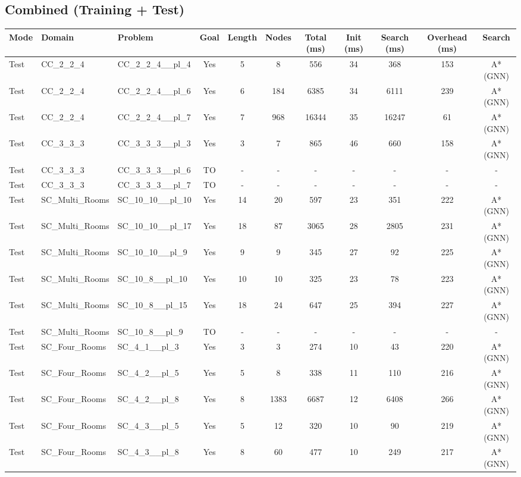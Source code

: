 \documentclass{article}
\begin{document}
\subsection*{Combined (Training + Test)}
\begin{tabular}{lllcccccccc}
\toprule
Mode & Domain & Problem & Goal & Length & Nodes & Total (ms) & Init (ms) & Search (ms) & Overhead (ms) & Search \\
\midrule
Test & CC\_2\_2\_4 & CC\_2\_2\_4\_\_pl\_4 & Yes & 5 & 8 & 556 & 34 & 368 & 153 & A*(GNN) \\
Test & CC\_2\_2\_4 & CC\_2\_2\_4\_\_pl\_6 & Yes & 6 & 184 & 6385 & 34 & 6111 & 239 & A*(GNN) \\
Test & CC\_2\_2\_4 & CC\_2\_2\_4\_\_pl\_7 & Yes & 7 & 968 & 16344 & 35 & 16247 & 61 & A*(GNN) \\
Test & CC\_3\_3\_3 & CC\_3\_3\_3\_\_pl\_3 & Yes & 3 & 7 & 865 & 46 & 660 & 158 & A*(GNN) \\
Test & CC\_3\_3\_3 & CC\_3\_3\_3\_\_pl\_6 & TO & - & - & - & - & - & - & - \\
Test & CC\_3\_3\_3 & CC\_3\_3\_3\_\_pl\_7 & TO & - & - & - & - & - & - & - \\
Test & SC\_Multi\_Rooms & SC\_10\_10\_\_pl\_10 & Yes & 14 & 20 & 597 & 23 & 351 & 222 & A*(GNN) \\
Test & SC\_Multi\_Rooms & SC\_10\_10\_\_pl\_17 & Yes & 18 & 87 & 3065 & 28 & 2805 & 231 & A*(GNN) \\
Test & SC\_Multi\_Rooms & SC\_10\_10\_\_pl\_9 & Yes & 9 & 9 & 345 & 27 & 92 & 225 & A*(GNN) \\
Test & SC\_Multi\_Rooms & SC\_10\_8\_\_pl\_10 & Yes & 10 & 10 & 325 & 23 & 78 & 223 & A*(GNN) \\
Test & SC\_Multi\_Rooms & SC\_10\_8\_\_pl\_15 & Yes & 18 & 24 & 647 & 25 & 394 & 227 & A*(GNN) \\
Test & SC\_Multi\_Rooms & SC\_10\_8\_\_pl\_9 & TO & - & - & - & - & - & - & - \\
Test & SC\_Four\_Rooms & SC\_4\_1\_\_pl\_3 & Yes & 3 & 3 & 274 & 10 & 43 & 220 & A*(GNN) \\
Test & SC\_Four\_Rooms & SC\_4\_2\_\_pl\_5 & Yes & 5 & 8 & 338 & 11 & 110 & 216 & A*(GNN) \\
Test & SC\_Four\_Rooms & SC\_4\_2\_\_pl\_8 & Yes & 8 & 1383 & 6687 & 12 & 6408 & 266 & A*(GNN) \\
Test & SC\_Four\_Rooms & SC\_4\_3\_\_pl\_5 & Yes & 5 & 12 & 320 & 10 & 90 & 219 & A*(GNN) \\
Test & SC\_Four\_Rooms & SC\_4\_3\_\_pl\_8 & Yes & 8 & 60 & 477 & 10 & 249 & 217 & A*(GNN) \\

\end{tabular}
\end{document}
